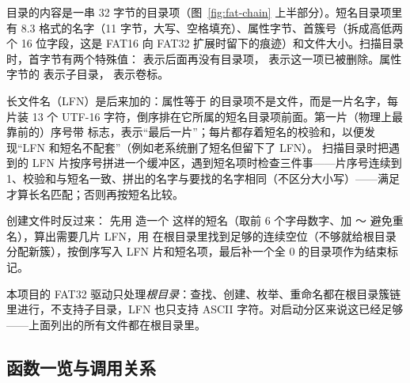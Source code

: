 目录的内容是一串 32 字节的目录项（图~\ref{fig:fat-chain} 上半部分）。短名目录项里有 8.3 格式的名字（11 字节，大写、空格填充）、属性字节、首簇号（拆成高低两个 16 位字段，这是 FAT16 向 FAT32 扩展时留下的痕迹）和文件大小。扫描目录时，首字节有两个特殊值： 表示后面再没有目录项， 表示这一项已被删除。属性字节的  表示子目录， 表示卷标。

长文件名（LFN）是后来加的：属性等于  的目录项不是文件，而是一片名字，每片装 13 个 UTF-16 字符，倒序排在它所属的短名目录项前面。第一片（物理上最靠前的）序号带  标志，表示“最后一片”；每片都存着短名的校验和，以便发现“LFN 和短名不配套”（例如老系统删了短名但留下了 LFN）。 扫描目录时把遇到的 LFN 片按序号拼进一个缓冲区，遇到短名项时检查三件事——片序号连续到 1、校验和与短名一致、拼出的名字与要找的名字相同（不区分大小写）——满足才算长名匹配；否则再按短名比较。

创建文件时反过来： 先用  造一个  这样的短名（取前 6 个字母数字、加 ～ 避免重名），算出需要几片 LFN，用  在根目录里找到足够的连续空位（不够就给根目录分配新簇），按倒序写入 LFN 片和短名项，最后补一个全 0 的目录项作为结束标记。

本项目的 FAT32 驱动只处理\emph{根目录}：查找、创建、枚举、重命名都在根目录簇链里进行，不支持子目录，LFN 也只支持 ASCII 字符。对启动分区来说这已经足够——上面列出的所有文件都在根目录里。

\subsection{函数一览与调用关系}

